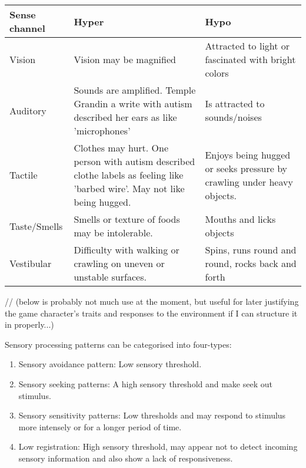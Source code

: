 \documentclass[11pt]{report}
\begin{document}
\begin{table}
    \begin{tabular}{| l | p{5cm} | p{5cm} |}
    \hline
    Sense channel & Hyper                                                                                                                      & Hypo                                                                   \\
    \hline
    \hline
    Vision        & Vision may be magnified                                                                                                    & Attracted to light or fascinated with bright colors                    \\
    \hline
    Auditory      & Sounds are amplified. Temple Grandin a write with autism described her ears as like 'microphones'                          & Is attracted to sounds/noises                                          \\
    \hline
    Tactile       & Clothes may hurt. One person with autism described clothe labels as feeling like 'barbed wire'. May not like being hugged. & Enjoys being hugged or seeks pressure by crawling under heavy objects. \\
    \hline
    Taste/Smells & Smells or texture of foods may be intolerable. & Mouths and licks objects \\
    \hline
    Vestibular & Difficulty with walking or crawling on uneven or unstable surfaces. & Spins, runs round and round, rocks back and forth \\
    \hline
    \end{tabular}
\end{table}

// (below is probably not much use at the moment, but useful for later justifying the game character's traits and responses to the environment if I can structure it in properly...)

Sensory processing patterns can be categorised into four-types\cite{sensory_leisure}:

\begin{enumerate}
\item Sensory avoidance pattern: Low sensory threshold. 
\item Sensory seeking patterns: A high sensory threshold and make seek out stimulus.
\item Sensory sensitivity patterns: Low thresholds and may respond to stimulus more intensely or for a longer period of time.
\item Low registration: High sensory threshold, may appear not to detect incoming sensory information and also show a lack of responsiveness.
\end{enumerate}
\end{document}
